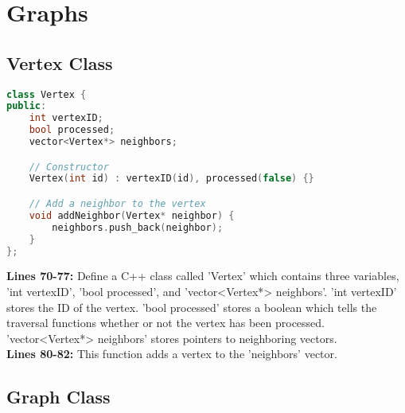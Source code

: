 \documentclass[letterpaper, 10pt,DIV=13]{scrartcl}
\numberwithin{equation}{section} %
\numberwithin{figure}{section} %
\numberwithin{table}{section} %
\begin{document}

\pagebreak

\section{Graphs}
\subsection{Vertex Class}

\begin{linenumbers}
\begin{lstlisting}[language=C++, caption={Linear Search}, label={code:example}]
class Vertex {
public:
    int vertexID;
    bool processed;
    vector<Vertex*> neighbors;

    // Constructor
    Vertex(int id) : vertexID(id), processed(false) {}

    // Add a neighbor to the vertex
    void addNeighbor(Vertex* neighbor) {
        neighbors.push_back(neighbor);
    }    
};

\end{lstlisting}
\end{linenumbers}
\nolinenumbers

\textbf{Lines 70-77:} Define a C++ class called ’Vertex’ which contains three variables, ’int vertexID’, ’bool processed’, and ’vector<Vertex*> neighbors’. ’int vertexID’ stores the ID of the vertex. ’bool processed’ stores a boolean which tells the traversal functions whether or not the vertex has been processed. ’vector<Vertex*> neighbors’ stores pointers to neighboring vectors. \\
\textbf{Lines 80-82:} This function adds a vertex to the 'neighbors' vector.

\subsection{Graph Class}
\end{document}
